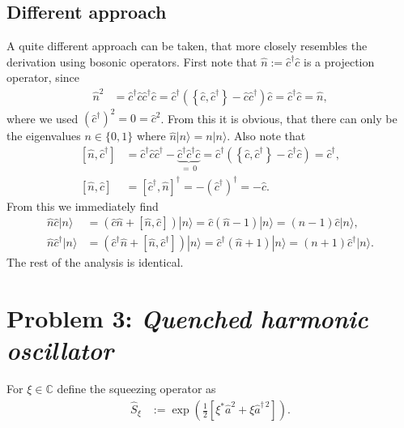 \documentclass[english, parskip=full]{scrartcl}
\newcommand{\kla}{}
\newcommand{\klam}{}
\newcommand{\klammer}{}
\newcommand{\Ket}{}
\begin{document}
\subsection*{Different approach}
A quite different approach can be taken, that more closely resembles the derivation using bosonic operators.
First note that $\hat{n}:=\hat{c}^\dagger \hat{c}$ is a projection operator, since
\begin{align}
\hat{n}^2 &= \hat{c}^\dagger\hat{c}\hat{c}^\dagger\hat{c} = \hat{c}^\dagger\kla\left( \klammer\left\{ \hat{c},\hat{c}^\dagger \right\} - \hat{c}\hat{c}^\dagger \right)\hat{c} = \hat{c}^\dagger\hat{c} = \hat{n},
\end{align}
where we used $(\hat{c}^\dagger)^2=0=\hat{c}^2$.
From this it is obvious, that there can only be the eigenvalues $n\in\{0,1\}$ where $\hat{n}\Ket | n \rangle = n\Ket | n \rangle$.
Also note that
\begin{align}
\klam\left[ \hat{n}, \hat{c}^\dagger \right] &= \hat{c}^\dagger\hat{c}\hat{c}^\dagger - \underbrace{\hat{c}^\dagger\hat{c}^\dagger\hat{c}}_{=\,0} = \hat{c}^\dagger \kla\left( \klammer\left\{ \hat{c}, \hat{c}^\dagger \right\} - \hat{c}^\dagger\hat{c} \right) = \hat{c}^\dagger,\\
\klam\left[ \hat{n}, \hat{c} \right] &= \klam\left[ \hat{c}^\dagger, \hat{n} \right]^\dagger  = -\kla\left( \hat{c}^\dagger \right)^\dagger = -\hat{c}.
\end{align}
From this we immediately find
\begin{align}
\hat{n}\hat{c}\Ket | n \rangle &= \kla\left( \hat{c}\hat{n} + \klam\left[ \hat{n}, \hat{c} \right] \right)\Ket | n \rangle = \hat{c}\kla\left( \hat{n}  -1 \right)\Ket | n \rangle = (n-1)\hat{c}\Ket | n \rangle,\\
\hat{n}\hat{c}^\dagger\Ket | n \rangle &= \kla\left( \hat{c}^\dagger\hat{n} + \klam\left[ \hat{n}, \hat{c}^\dagger \right] \right)\Ket | n \rangle = \hat{c}^\dagger\kla\left( \hat{n} + 1 \right)\Ket | n \rangle = (n+1)\hat{c}^\dagger\Ket | n \rangle.
\end{align}
The rest of the analysis is identical.

\newpage
\section*{Problem 3: \normalfont\textit{\large{Quenched harmonic oscillator}}}
For $\xi\in\mathbb{C}$ define the squeezing operator as \begin{align}
\hat{S}_\xi&:=\exp\kla\left( \frac{1}{2}\klam\left[ \xi^\ast\hat{a}^2+\xi\hat{a}^{\dagger\,2} \right] \right).
\end{align}
\end{document}
